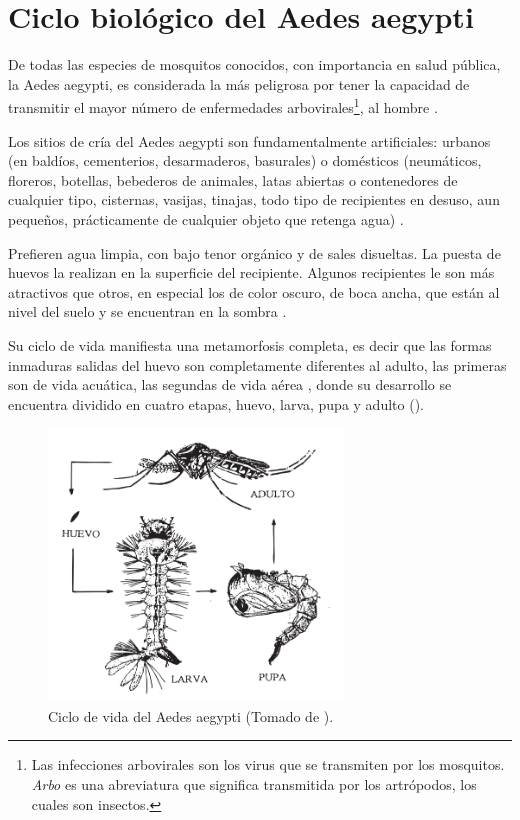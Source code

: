 
\section{Ciclo biológico del Aedes aegypti}
\label{sec:caracteristicas-biologicas}
De todas las especies de mosquitos conocidos, con importancia en salud pública, la Aedes aegypti,
es considerada la más peligrosa por tener la capacidad de transmitir el mayor número de enfermedades arbovirales\footnote{Las infecciones arbovirales son los virus que se transmiten por
los mosquitos. \textit{Arbo} es una abreviatura que significa transmitida por los artrópodos, los
cuales son insectos.}, al hombre \cite{ThironIzcazaJ2003}.

Los sitios de cría del Aedes aegypti son fundamentalmente artificiales: urbanos (en baldíos,
cementerios, desarmaderos, basurales) o domésticos (neumáticos, floreros, botellas, bebederos de
animales, latas abiertas o contenedores de cualquier tipo, cisternas, vasijas, tinajas, todo tipo
de recipientes en desuso, aun pequeños, prácticamente de cualquier objeto que retenga agua)
\cite{world2009dengue, directricesDetvArg}.

Prefieren agua limpia, con bajo tenor orgánico y de sales disueltas. La puesta de huevos la
realizan en la superficie del recipiente. Algunos recipientes le son más atractivos que otros, en
especial los de color oscuro, de boca ancha, que están al nivel del suelo y se encuentran en la
sombra \cite{ThironIzcazaJ2003}.

Su ciclo de vida manifiesta una metamorfosis completa, es decir que las formas inmaduras salidas
del huevo son completamente diferentes al adulto, las primeras son de vida acuática, las segundas
de vida aérea \cite{directricesDetvArg}, donde su desarrollo se encuentra dividido en cuatro
etapas, huevo, larva, pupa y adulto \cite{web-site:gMonteroBiologia}
().

\begin{figure}
\centering
\includegraphics[width=0.7\textwidth]{capitulo-3/graphics/ciclo-de-vida.png}
\caption{\label{fig:cap3-ciclo-de-vida} Ciclo de vida del Aedes aegypti (Tomado de
\cite{directricesDetvArg}).}
\end{figure}

